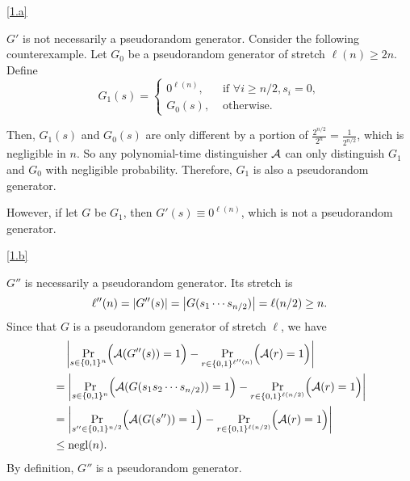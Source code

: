 \documentclass{homework}
\begin{document}
\begin{solution}

  \ref{1.a}

  $G'$ is not necessarily a pseudorandom generator. Consider the following
  counterexample. Let $G_0$ be a pseudorandom generator of stretch $\ell(n) \ge 2n$.
  Define
  \begin{equation*}
    G_1(s) = \begin{cases}
      0^{\ell(n)}, & \text{ if } \forall i \ge n/2, s_i = 0, \\
      G_0(s), & \text{ otherwise}.
    \end{cases}
  \end{equation*}

  Then, $G_1(s)$ and $G_0(s)$ are only different by a portion of
  $\frac{2^{n/2}}{2^n} = \frac{1}{2^{n/2}}$, which is negligible in $n$.
  So any polynomial-time distinguisher $\mathcal{A}$ can only distinguish $G_1$ and $G_0$
  with negligible probability. Therefore, $G_1$ is also a pseudorandom generator.

  However, if let $G$ be $G_1$, then $G'(s) \equiv 0^{\ell(n)}$, which is not a
  pseudorandom generator.

  \ref{1.b}
  
  $G''$ is necessarily a pseudorandom generator. Its stretch is
  \begin{equation*}
    \ell''(n) = \left\lvert G''(s) \right\rvert = \left\lvert G(s_{1} \cdots s_{n/2}) \right\rvert = \ell(n/2) \ge n.
  \end{equation*}
  Since that $G$ is a pseudorandom generator of stretch $\ell$, we have
  \begin{align*}
    & \quad \left\lvert \Pr_{s \in \{0, 1\}^n} \Bigl(\mathcal{A}(G''(s)) = 1\Bigr) - \Pr_{r \in \{0, 1\}^{\ell''(n)}}\Bigl(\mathcal{A}(r) = 1\Bigr) \right\rvert \\
    & = \left\lvert \Pr_{s \in \{0, 1\}^n} \Bigl(\mathcal{A}(G(s_1 s_2 \cdots s_{n/2})) = 1\Bigr) - \Pr_{r \in \{0, 1\}^{\ell(n/2)}}\Bigl(\mathcal{A}(r) = 1\Bigr) \right\rvert \\
    & = \left\lvert \Pr_{s'' \in \{0, 1\}^{n/2}} \Bigl(\mathcal{A}(G(s'')) = 1\Bigr) - \Pr_{r \in \{0, 1\}^{\ell(n/2)}}\Bigl(\mathcal{A}(r) = 1\Bigr) \right\rvert \\
    & \le \mathrm{negl}(n).
  \end{align*}
  By definition, $G''$ is a pseudorandom generator.

\end{solution}
\end{document}
